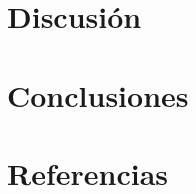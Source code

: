 \documentclass[12pt,a4paper,twocolumn]{article}
\begin{document}
\section{Discusión}


\section{Conclusiones}


\section*{Referencias}
\renewcommand{\refname}{}




\clearpage
\appendix

\end{document}
